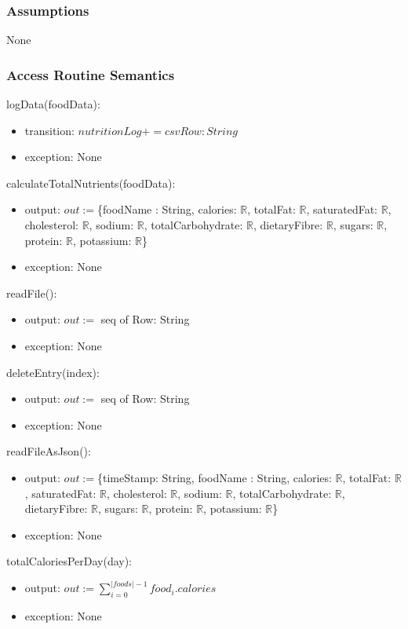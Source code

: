 \documentclass[12pt, titlepage]{article}
\begin{document}
\subsubsection{Assumptions}
None
\subsubsection{Access Routine Semantics}
\noindent logData(foodData):
\begin{itemize}
	\item transition: $nutritionLog += csvRow : String$ 
	\item exception: None
\end{itemize}
\noindent calculateTotalNutrients(foodData):
\begin{itemize}
	\item output: $out :=$\{foodName : String, calories: $\mathbb{R}$, 
	totalFat: $\mathbb{R}$, saturatedFat: $\mathbb{R}$, cholesterol: 
	$\mathbb{R}$, sodium: $\mathbb{R}$, totalCarbohydrate: $\mathbb{R}$, 
	dietaryFibre: $\mathbb{R}$, sugars: $\mathbb{R}$, protein: $\mathbb{R}$, 
	potassium: $\mathbb{R}$\} 
	\item exception: None
\end{itemize}
\noindent readFile():
\begin{itemize}
	\item output: $out :=$ seq of Row: String 
	\item exception: None
\end{itemize}
\noindent deleteEntry(index):
\begin{itemize}
	\item output: $out :=$ seq of Row: String 
	\item exception: None
\end{itemize}
\noindent readFileAsJson():
\begin{itemize}
	\item output: $out := $\{timeStamp: String, foodName : String, calories: 
	$\mathbb{R}$, 
	totalFat: $\mathbb{R}$, saturatedFat: $\mathbb{R}$, cholesterol: 
	$\mathbb{R}$, sodium: $\mathbb{R}$, totalCarbohydrate: $\mathbb{R}$, 
	dietaryFibre: $\mathbb{R}$, sugars: $\mathbb{R}$, protein: $\mathbb{R}$, 
	potassium: $\mathbb{R}$\} 
	\item exception: None
\end{itemize}
\noindent totalCaloriesPerDay(day):
\begin{itemize}
	\item output: $out := \sum_{i=0}^{|foods|-1}food_i.calories$ 
	\item exception: None
\end{itemize}
\end{document}
